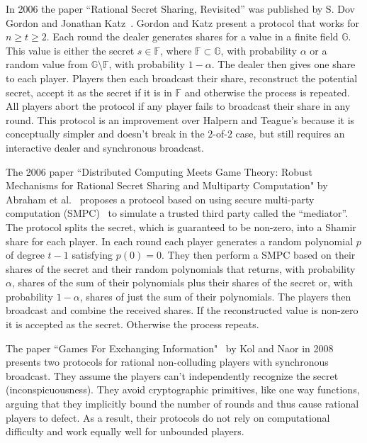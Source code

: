 \documentclass[12pt]{dalcsthesis}
\begin{document}
In 2006 the paper ``Rational Secret Sharing, Revisited'' was published by S. Dov Gordon and Jonathan Katz~\cite{gordon06}. Gordon and Katz present a protocol that works for $n \geq t \geq 2$. Each round the dealer generates shares for a value in a finite field $\mathbb{G}$. This value is either the secret $s \in \mathbb{F}$, where $\mathbb{F} \subset \mathbb{G}$, with probability $\alpha$ or a random value from $\mathbb{G} \setminus \mathbb{F}$, with probability $1-\alpha$. The dealer then gives one share to each player. Players then each broadcast their share, reconstruct the potential secret, accept it as the secret if it is in $\mathbb{F}$ and otherwise the process is repeated. All players abort the protocol if any player fails to broadcast their share in any round. This protocol is an improvement over Halpern and Teague's because it is conceptually simpler and doesn't break in the $2$-of-$2$ case, but still requires an interactive dealer and synchronous broadcast.

The 2006 paper ``Distributed Computing Meets Game Theory: Robust Mechanisms for Rational Secret Sharing and Multiparty Computation" by Abraham et al.~\cite{abraham06} proposes a protocol based on using secure multi-party computation (SMPC)~\cite{Yao82} to simulate a trusted third party called the ``mediator''. The protocol splits the secret, which is guaranteed to be non-zero, into a Shamir share for each player. In each round each player generates a random polynomial $p$ of degree $t-1$ satisfying $p(0) = 0$. They then perform a SMPC based on their shares of the secret and their random polynomials that returns, with probability $\alpha$, shares of the sum of their polynomials plus their shares of the secret or, with probability $1-\alpha$, shares of just the sum of their polynomials. The players then broadcast and combine the received shares. If the reconstructed value is non-zero it is accepted as the secret. Otherwise the process repeats.

The paper ``Games For Exchanging Information"~\cite{kol08} by Kol and Naor in 2008 presents two protocols for rational non-colluding players with synchronous broadcast. They assume the players can't independently recognize the secret (inconspicuousness). They avoid cryptographic primitives, like one way functions, arguing that they implicitly bound the number of rounds and thus cause rational players to defect. As a result, their protocols do not rely on computational difficulty and work equally well for unbounded players.
\end{document}
